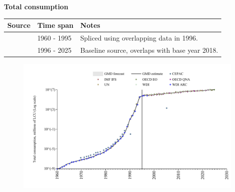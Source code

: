 \documentclass[12pt,a4paper,landscape]{article}
\begin{document}
\begin{adjustbox}{max totalsize={\paperwidth}{\paperheight},center}
\begin{minipage}[t][\textheight][t]{\textwidth}
\vspace*{0.5cm}
{}
\begin{center}
{\Large\bfseries Total consumption}
\end{center}
\vspace{0.5cm}
\begin{table}[H]
\centering
\small
\begin{tabular}{|l|l|l|}
\hline
\textbf{Source} & \textbf{Time span} & \textbf{Notes} \\
\hline
\rowcolor{white}\cite{WDI}& 1960 - 1995 &Spliced using overlapping data in 1996. \\
\rowcolor{lightgray}\cite{OECD_EO}& 1996 - 2025 &Baseline source, overlaps with base year 2018. \\
\hline
\end{tabular}
\end{table}
\begin{figure}[H]
\centering
\includegraphics[width=\textwidth,height=0.6\textheight,keepaspectratio]{graphs/BRA_cons.pdf}
\end{figure}
\end{minipage}
\end{adjustbox}
\end{document}
